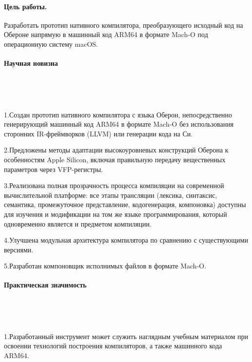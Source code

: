 \documentclass[utf8]{lgu}
\begin{document}
\paragraph{Цель работы.}

Разработать прототип нативного компилятора, преобразующего исходный код на Обероне напрямую в машинный код ARM64 в формате Mach‑O под операционную систему macOS.

\paragraph{Научная новизна}

~

~

1.\hspace{0.5em}Создан прототип нативного компилятора с языка Оберон, непосредственно генерирующий машинный код ARM64 в формате Mach‑O без использования сторонних IR-фреймворков (LLVM) или генерации кода на Си.

2.\hspace{0.5em}Предложены методы адаптации высокоуровневых конструкций Оберона к особенностям Apple Silicon, включая правильную передачу вещественных параметров через VFP-регистры.

3.\hspace{0.5em}Реализована полная прозрачность процесса компиляции на современной вычислительной платформе: все этапы трансляции (лексика, синтаксис, семантика, промежуточное представление, кодогенерация, компоновка) доступны для изучения и модификации на том же языке программирования, который одновременно является и предметом компиляции.

4.\hspace{0.5em}Улучшена модульная архитектура компилятора по сравнению с существующими версиями.

5.\hspace{0.5em}Разработан компоновщик исполнимых файлов в формате Mach‑O.

\paragraph{Практическая значимость}

~

~

1.\hspace{0.5em}Разработанный инструмент может служить наглядным учебным материалом при освоении технологий построения компиляторов, а также машинного кода ARM64.
\end{document}
